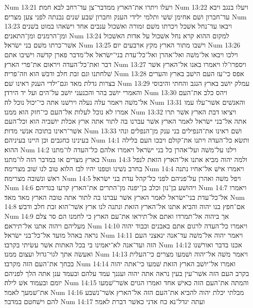 Num 13:21  ויעלו ויתרו את־הארץ ממדבר־צן עד־רחב לבא חמת׃
Num 13:22  ויעלו בנגב ויבא עד־חברון ושׁם אחימן שׁשׁי ותלמי ילידי הענק וחברון שׁבע שׁנים נבנתה לפני צען מצרים׃
Num 13:23  ויבאו עד־נחל אשׁכל ויכרתו משׁם זמורה ואשׁכול ענבים אחד וישׂאהו במוט בשׁנים ומן־הרמנים ומן־התאנים׃
Num 13:24  למקום ההוא קרא נחל אשׁכול על אדות האשׁכול אשׁר־כרתו משׁם בני ישׂראל׃
Num 13:25  וישׁבו מתור הארץ מקץ ארבעים יום׃
Num 13:26  וילכו ויבאו אל־משׁה ואל־אהרן ואל־כל־עדת בני־ישׂראל אל־מדבר פארן קדשׁה וישׁיבו אתם דבר ואת־כל־העדה ויראום את־פרי הארץ׃
Num 13:27  ויספרו־לו ויאמרו באנו אל־הארץ אשׁר שׁלחתנו וגם זבת חלב ודבשׁ הוא וזה־פריה׃
Num 13:28  אפס כי־עז העם הישׁב בארץ והערים בצרות גדלת מאד וגם־ילדי הענק ראינו שׁם׃
Num 13:29  עמלק יושׁב בארץ הנגב והחתי והיבוסי והאמרי יושׁב בהר והכנעני יושׁב על־הים ועל יד הירדן׃
Num 13:30  ויהס כלב את־העם אל־משׁה ויאמר עלה נעלה וירשׁנו אתה כי־יכול נוכל לה׃
Num 13:31  והאנשׁים אשׁר־עלו עמו אמרו לא נוכל לעלות אל־העם כי־חזק הוא ממנו׃
Num 13:32  ויציאו דבת הארץ אשׁר תרו אתה אל־בני ישׂראל לאמר הארץ אשׁר עברנו בה לתור אתה ארץ אכלת יושׁביה הוא וכל־העם אשׁר־ראינו בתוכה אנשׁי מדות׃
Num 13:33  ושׁם ראינו את־הנפילים בני ענק מן־הנפלים ונהי בעינינו כחגבים וכן היינו בעיניהם׃
Num 14:1  ותשׂא כל־העדה ויתנו את־קולם ויבכו העם בלילה ההוא׃
Num 14:2  וילנו על־משׁה ועל־אהרן כל בני ישׂראל ויאמרו אלהם כל־העדה לו־מתנו בארץ מצרים או במדבר הזה לו־מתנו׃
Num 14:3  ולמה יהוה מביא אתנו אל־הארץ הזאת לנפל בחרב נשׁינו וטפנו יהיו לבז הלוא טוב לנו שׁוב מצרימה׃
Num 14:4  ויאמרו אישׁ אל־אחיו נתנה ראשׁ ונשׁובה מצרימה׃
Num 14:5  ויפל משׁה ואהרן על־פניהם לפני כל־קהל עדת בני ישׂראל׃
Num 14:6  ויהושׁע בן־נון וכלב בן־יפנה מן־התרים את־הארץ קרעו בגדיהם׃
Num 14:7  ויאמרו אל־כל־עדת בני־ישׂראל לאמר הארץ אשׁר עברנו בה לתור אתה טובה הארץ מאד מאד׃
Num 14:8  אם־חפץ בנו יהוה והביא אתנו אל־הארץ הזאת ונתנה לנו ארץ אשׁר־הוא זבת חלב ודבשׁ׃
Num 14:9  אך ביהוה אל־תמרדו ואתם אל־תיראו את־עם הארץ כי לחמנו הם סר צלם מעליהם ויהוה אתנו אל־תיראם׃
Num 14:10  ויאמרו כל־העדה לרגום אתם באבנים וכבוד יהוה נראה באהל מועד אל־כל־בני ישׂראל׃
Num 14:11  ויאמר יהוה אל־משׁה עד־אנה ינאצני העם הזה ועד־אנה לא־יאמינו בי בכל האתות אשׁר עשׂיתי בקרבו׃
Num 14:12  אכנו בדבר ואורשׁנו ואעשׂה אתך לגוי־גדול ועצום ממנו׃
Num 14:13  ויאמר משׁה אל־יהוה ושׁמעו מצרים כי־העלית בכחך את־העם הזה מקרבו׃
Num 14:14  ואמרו אל־יושׁב הארץ הזאת שׁמעו כי־אתה יהוה בקרב העם הזה אשׁר־עין בעין נראה אתה יהוה ועננך עמד עלהם ובעמד ענן אתה הלך לפניהם יומם ובעמוד אשׁ לילה׃
Num 14:15  והמתה את־העם הזה כאישׁ אחד ואמרו הגוים אשׁר־שׁמעו את־שׁמעך לאמר׃
Num 14:16  מבלתי יכלת יהוה להביא את־העם הזה אל־הארץ אשׁר־נשׁבע להם וישׁחטם במדבר׃
Num 14:17  ועתה יגדל־נא כח אדני כאשׁר דברת לאמר׃
